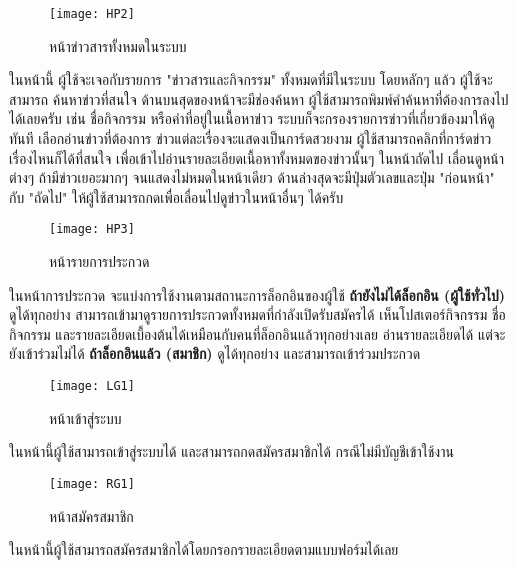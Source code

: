 \newpage

\begin{figure}[h]
	\centering
	\texttt{[image: HP2]}
	\caption{หน้าข่าวสารทั้งหมดในระบบ}
\end{figure}

\indent ในหน้านี้ ผู้ใช้จะเจอกับรายการ "ข่าวสารและกิจกรรม" ทั้งหมดที่มีในระบบ โดยหลักๆ แล้ว ผู้ใช้จะสามารถ ค้นหาข่าวที่สนใจ ด้านบนสุดของหน้าจะมีช่องค้นหา ผู้ใช้สามารถพิมพ์คำค้นหาที่ต้องการลงไปได้เลยครับ เช่น ชื่อกิจกรรม หรือคำที่อยู่ในเนื้อหาข่าว ระบบก็จะกรองรายการข่าวที่เกี่ยวข้องมาให้ดูทันที
เลือกอ่านข่าวที่ต้องการ ข่าวแต่ละเรื่องจะแสดงเป็นการ์ดสวยงาม ผู้ใช้สามารถคลิกที่การ์ดข่าวเรื่องไหนก็ได้ที่สนใจ เพื่อเข้าไปอ่านรายละเอียดเนื้อหาทั้งหมดของข่าวนั้นๆ ในหน้าถัดไป
เลื่อนดูหน้าต่างๆ ถ้ามีข่าวเยอะมากๆ จนแสดงไม่หมดในหน้าเดียว ด้านล่างสุดจะมีปุ่มตัวเลขและปุ่ม "ก่อนหน้า" กับ "ถัดไป" ให้ผู้ใช้สามารถกดเพื่อเลื่อนไปดูข่าวในหน้าอื่นๆ ได้ครับ

\vspace{\baselineskip}

\begin{figure}[h]
	\centering
	\texttt{[image: HP3]}
	\caption{หน้ารายการประกวด}
\end{figure}

\indent ในหน้าการประกวด จะแบ่งการใช้งานตามสถานะการล็อกอินของผู้ใช้ \textbf{ถ้ายังไม่ได้ล็อกอิน (ผู้ใช้ทั่วไป)} ดูได้ทุกอย่าง สามารถเข้ามาดูรายการประกวดทั้งหมดที่กำลังเปิดรับสมัครได้ เห็นโปสเตอร์กิจกรรม ชื่อกิจกรรม และรายละเอียดเบื้องต้นได้เหมือนกับคนที่ล็อกอินแล้วทุกอย่างเลย อ่านรายละเอียดได้ แต่จะยังเข้าร่วมไม่ได้ \textbf{ถ้าล็อกอินแล้ว (สมาชิก)} ดูได้ทุกอย่าง และสามารถเข้าร่วมประกวด

\newpage

\begin{figure}[h]
	\centering
	\texttt{[image: LG1]}
	\caption{หน้าเข้าสู่ระบบ}
\end{figure}

\indent ในหน้านี้ผู้ใช้สามารถเข้าสู่ระบบได้ และสามารถกดสมัครสมาชิกได้ กรณีไม่มีบัญชีเข้าใช้งาน

\vspace{\baselineskip}

\begin{figure}[h]
	\centering
	\texttt{[image: RG1]}
	\caption{หน้าสมัครสมาชิก}
\end{figure}

\indent ในหน้านี้ผู้ใช้สามารถสมัครสมาชิกได้โดยกรอกรายละเอียดตามแบบฟอร์มได้เลย


